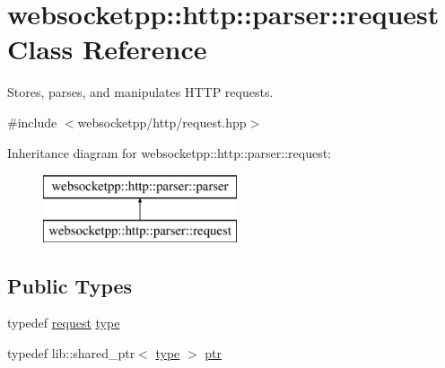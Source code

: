 \hypertarget{classwebsocketpp_1_1http_1_1parser_1_1request}{}\section{websocketpp\+:\+:http\+:\+:parser\+:\+:request Class Reference}
\label{classwebsocketpp_1_1http_1_1parser_1_1request}


Stores, parses, and manipulates H\+T\+T\+P requests.  




{\ttfamily \#include $<$websocketpp/http/request.\+hpp$>$}

Inheritance diagram for websocketpp\+:\+:http\+:\+:parser\+:\+:request\+:\begin{figure}[H]
\begin{center}
\leavevmode
\includegraphics[height=2.000000cm]{classwebsocketpp_1_1http_1_1parser_1_1request}
\end{center}
\end{figure}
\subsection*{Public Types}
\begin{DoxyCompactItemize}
\item 
typedef \hyperlink{classwebsocketpp_1_1http_1_1parser_1_1request}{request} \hyperlink{classwebsocketpp_1_1http_1_1parser_1_1request_a456cf14e4c5fd1dab94910580042de6b}{type}
\item 
typedef lib\+::shared\+\_\+ptr$<$ \hyperlink{classwebsocketpp_1_1http_1_1parser_1_1request_a456cf14e4c5fd1dab94910580042de6b}{type} $>$ \hyperlink{classwebsocketpp_1_1http_1_1parser_1_1request_aa9284144353524d93cedf6c053ac07cf}{ptr}
\end{DoxyCompactItemize}
